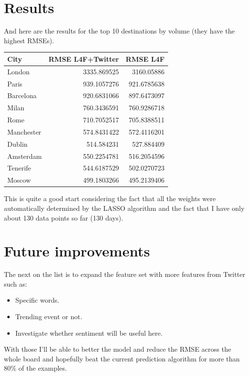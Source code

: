 \documentclass[minf,frontabs,twoside,singlespacing,parskip]{infthesis}
\begin{document}
\newpage
\section{Results}

And here are the results for the top 10 destinations by volume (they have the highest RMSEs).

\begin{tabular}{ l | r | r }
City	& RMSE L4F+Twitter &RMSE L4F \\
\hline
London & 3335.869525 & 3160.05886 \\
Paris	 & 939.1057276 & 921.6785638  \\
Barcelona & 920.6831066 & 897.6473097  \\
Milan & 760.3436591 & 760.9286718  \\
Rome & 710.7052517 & 705.8388511  \\
Manchester & 574.8431422 & 572.4116201  \\
Dublin & 514.584231	 & 527.884409  \\
Amsterdam & 550.2254781 & 516.2054596  \\
Tenerife & 544.6187529 & 502.0270723  \\
Moscow & 499.1803266 & 495.2139406  \\
\end{tabular}


This is quite a good start considering the fact that all the weights were automatically determined by the LASSO algorithm and the fact that I have only about 130 data points so far (130 days).

\section{Future improvements}

The next on the list is to expand the feature set with more features from Twitter such as:


\begin{itemize}
\item Specific words.
\item Trending event or not.
\item Investigate whether sentiment will be useful here.
\end{itemize}

With those I'll be able to better the model and reduce the RMSE across the whole board and hopefully beat the current prediction algorithm for more than 80\% of the examples.
\end{document}
